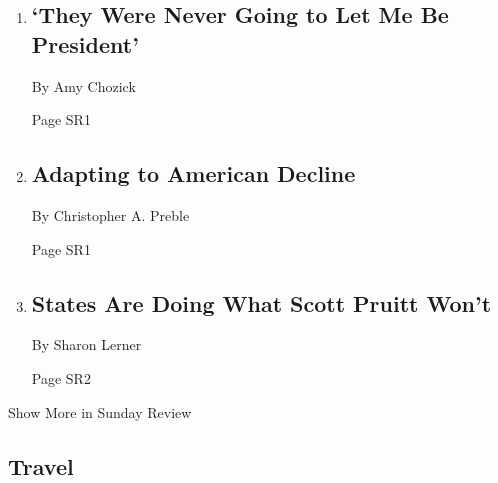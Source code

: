 \begin{enumerate}
\def\labelenumi{\arabic{enumi}.}
\item
  \href{/2018/04/20/sunday-review/hillary-clinton-chasing-hillary.html}{}

  \hypertarget{they-were-never-going-to-let-me-be-president}{%
  \subsection{`They Were Never Going to Let Me Be
  President'}\label{they-were-never-going-to-let-me-be-president}}

  By Amy Chozick

  Page SR1
\item
  \href{/2018/04/21/opinion/sunday/adapting-to-american-decline.html}{}

  \hypertarget{adapting-to-american-decline}{%
  \subsection{Adapting to American
  Decline}\label{adapting-to-american-decline}}

  By Christopher A. Preble

  Page SR1
\item
  \href{/2018/04/21/opinion/sunday/states-are-doing-what-scott-pruitt-wont.html}{}

  \hypertarget{states-are-doing-what-scott-pruitt-wont}{%
  \subsection{States Are Doing What Scott Pruitt
  Won't}\label{states-are-doing-what-scott-pruitt-wont}}

  By Sharon Lerner

  Page SR2
\end{enumerate}

Show More in Sunday Review

\hypertarget{travel}{%
\subsection{Travel}\label{travel}}


